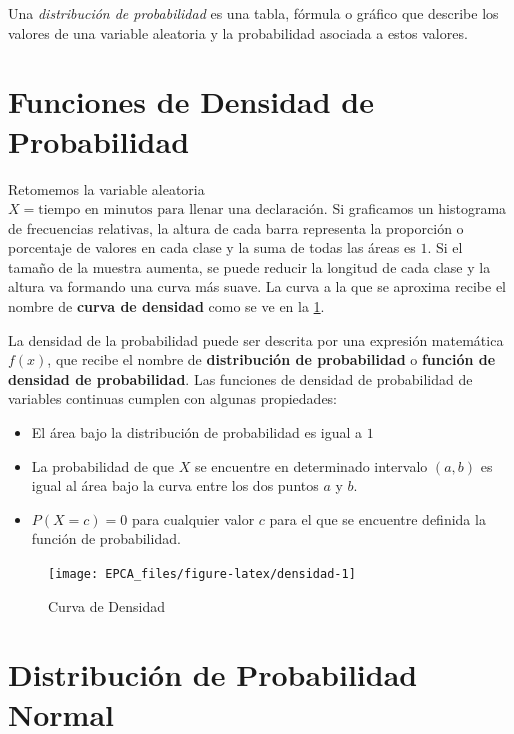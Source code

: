 \documentclass[letterpaper,]{book}
\providecommand{\tightlist}{%
  \setlength{\itemsep}{0pt}\setlength{\parskip}{0pt}}
\begin{document}
Una \emph{distribución de probabilidad} es una tabla, fórmula o gráfico que describe los valores de una variable aleatoria y la probabilidad asociada a estos valores.

\hypertarget{funciones-de-densidad-de-probabilidad}{%
\section{Funciones de Densidad de Probabilidad}\label{funciones-de-densidad-de-probabilidad}}

Retomemos la variable aleatoria \(X= \text{tiempo en minutos para llenar una declaración}\). Si graficamos un histograma de frecuencias relativas, la altura de cada barra representa la proporción o porcentaje de valores en cada clase y la suma de todas las áreas es \(1\). Si el tamaño de la muestra aumenta, se puede reducir la longitud de cada clase y la altura va formando una curva más suave. La curva a la que se aproxima recibe el nombre de \textbf{curva de densidad} como se ve en la \ref{fig:densidad}.

La densidad de la probabilidad puede ser descrita por una expresión matemática \(f\left(x\right)\), que recibe el nombre de \textbf{distribución de probabilidad} o \textbf{función de densidad de probabilidad}. Las funciones de densidad de probabilidad de variables continuas cumplen con algunas propiedades:

\begin{itemize}
\tightlist
\item
  El área bajo la distribución de probabilidad es igual a \(1\)
\item
  La probabilidad de que \(X\) se encuentre en determinado intervalo \(\left(a,b\right)\) es igual al área bajo la curva entre los dos puntos \(a\) y \(b\).
\item
  \(P\left(X=c\right)=0\) para cualquier valor \(c\) para el que se encuentre definida la función de probabilidad.
\end{itemize}

\begin{figure}[h!]

{\centering \texttt{[image: EPCA\_files/figure-latex/densidad-1]} 

}

\caption{Curva de Densidad}\label{fig:densidad}
\end{figure}

\hypertarget{distribucion-de-probabilidad-normal}{%
\section{Distribución de Probabilidad Normal}\label{distribucion-de-probabilidad-normal}}
\end{document}
